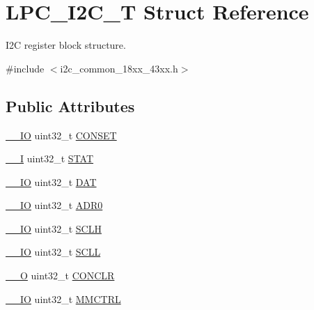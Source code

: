 \hypertarget{struct_l_p_c___i2_c___t}{}\section{L\+P\+C\+\_\+\+I2\+C\+\_\+T Struct Reference}
\label{struct_l_p_c___i2_c___t}


I2C register block structure.  




{\ttfamily \#include $<$i2c\+\_\+common\+\_\+18xx\+\_\+43xx.\+h$>$}

\subsection*{Public Attributes}
\begin{DoxyCompactItemize}
\item 
\hyperlink{core__sc300_8h_aec43007d9998a0a0e01faede4133d6be}{\+\_\+\+\_\+\+IO} uint32\+\_\+t \hyperlink{struct_l_p_c___i2_c___t_a98ed6d816b3c7e00a29b32956fe5fa2d}{C\+O\+N\+S\+ET}
\item 
\hyperlink{core__sc300_8h_af63697ed9952cc71e1225efe205f6cd3}{\+\_\+\+\_\+I} uint32\+\_\+t \hyperlink{struct_l_p_c___i2_c___t_ae806722ff38a93680338e5607d96156d}{S\+T\+AT}
\item 
\hyperlink{core__sc300_8h_aec43007d9998a0a0e01faede4133d6be}{\+\_\+\+\_\+\+IO} uint32\+\_\+t \hyperlink{struct_l_p_c___i2_c___t_ab3babd27c9d202c1fefce13d5498d473}{D\+AT}
\item 
\hyperlink{core__sc300_8h_aec43007d9998a0a0e01faede4133d6be}{\+\_\+\+\_\+\+IO} uint32\+\_\+t \hyperlink{struct_l_p_c___i2_c___t_a900e0819e3f450e08a3566caf6f18851}{A\+D\+R0}
\item 
\hyperlink{core__sc300_8h_aec43007d9998a0a0e01faede4133d6be}{\+\_\+\+\_\+\+IO} uint32\+\_\+t \hyperlink{struct_l_p_c___i2_c___t_a73be20e257e178ea0deafd0057cc7900}{S\+C\+LH}
\item 
\hyperlink{core__sc300_8h_aec43007d9998a0a0e01faede4133d6be}{\+\_\+\+\_\+\+IO} uint32\+\_\+t \hyperlink{struct_l_p_c___i2_c___t_a1cd0d0f95f90d6e6c3380f112144085b}{S\+C\+LL}
\item 
\hyperlink{core__sc300_8h_a7e25d9380f9ef903923964322e71f2f6}{\+\_\+\+\_\+O} uint32\+\_\+t \hyperlink{struct_l_p_c___i2_c___t_a091c12dd25fb7db692339da933c8b523}{C\+O\+N\+C\+LR}
\item 
\hyperlink{core__sc300_8h_aec43007d9998a0a0e01faede4133d6be}{\+\_\+\+\_\+\+IO} uint32\+\_\+t \hyperlink{struct_l_p_c___i2_c___t_ace2d21c2a5042f1355f98b2e687ae8c1}{M\+M\+C\+T\+RL}

\end{DoxyCompactItemize}
